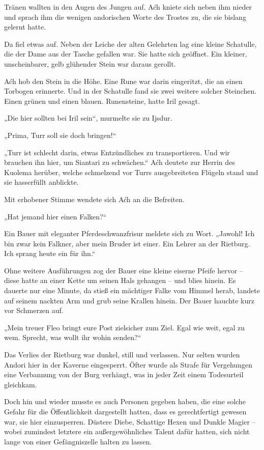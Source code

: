 Tränen wallten in den Augen des Jungen auf. Aćh kniete sich neben ihm nieder und sprach ihm die wenigen andorischen Worte des Trostes zu, die sie bislang gelernt hatte.

Da fiel etwas auf. Neben der Leiche der alten Gelehrten lag eine kleine Schatulle, die der Dame aus der Tasche gefallen war. Sie hatte sich geöffnet. Ein kleiner, unscheinbarer, gelb glühender Stein war daraus gerollt.

Aćh hob den Stein in die Höhe. Eine Rune war darin eingeritzt, die an einen Torbogen erinnerte. Und in der Schatulle fand sie zwei weitere solcher Steinchen. Einen grünen und einen blauen. Runensteine, hatte Iril gesagt.

„Die hier sollten bei Iril sein“, murmelte sie zu Ijsdur.

„Prima, Turr soll sie doch bringen!“

„Turr ist schlecht darin, etwas Entzündliches zu transportieren. Und wir brauchen ihn hier, um Siantari zu schwächen.“ Aćh deutete zur Herrin des Kuolema herüber, welche schmelzend vor Turrs ausgebreiteten Flügeln stand und sie hasserfüllt anblickte.

Mit erhobener Stimme wendete sich Aćh an die Befreiten.

„Hat jemand hier einen Falken?“

Ein Bauer mit eleganter Pferdeschwanzfrisur meldete sich zu Wort. „Jawohl! Ich bin zwar kein Falkner, aber mein Bruder ist einer. Ein Lehrer an der Rietburg. Ich sprang heute ein für ihn.“

Ohne weitere Ausführungen zog der Bauer eine kleine eiserne Pfeife hervor – diese hatte an einer Kette um seinen Hals gehangen – und blies hinein. Es dauerte nur eine Minute, da stieß ein mächtiger Falke vom Himmel herab, landete auf seinem nackten Arm und grub seine Krallen hinein. Der Bauer hauchte kurz vor Schmerzen auf.

„Mein treuer Fleo bringt eure Post zielsicher zum Ziel. Egal wie weit, egal zu wem. Sprecht, was wollt ihr wohin senden?“\bigskip







Das Verlies der Rietburg war dunkel, still und verlassen. Nur selten wurden Andori hier in der Kaverne eingesperrt. Öfter wurde als Strafe für Vergehungen eine Verbannung von der Burg verhängt, was in jeder Zeit einem Todesurteil gleichkam.

Doch hin und wieder musste es auch Personen gegeben haben, die eine solche Gefahr für die Öffentlichkeit dargestellt hatten, dass es gerechtfertigt gewesen war, sie hier einzusperren. Düstere Diebe, Schattige Hexen und Dunkle Magier – wobei zumindest letztere ein außergewöhnliches Talent dafür hatten, sich nicht lange von einer Gefängniszelle halten zu lassen.


